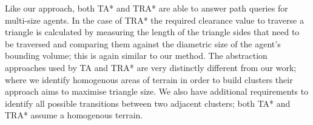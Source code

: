 Like our approach, both TA* and TRA* are able to answer path queries for multi-size agents. In the case of TRA* the required clearance value to traverse a triangle is calculated by measuring the length of the triangle sides that need to be traversed and comparing them against the diametric size of the agent's bounding volume; this is again similar to our method. The abstraction approaches used by TA and TRA* are very distinctly different from our work; where we identify homogenous areas of terrain in order to build clusters their approach aims to maximise triangle size. We also have additional requirements to identify all possible transitions between two adjacent clusters; both TA* and TRA* assume a homogenous terrain.

